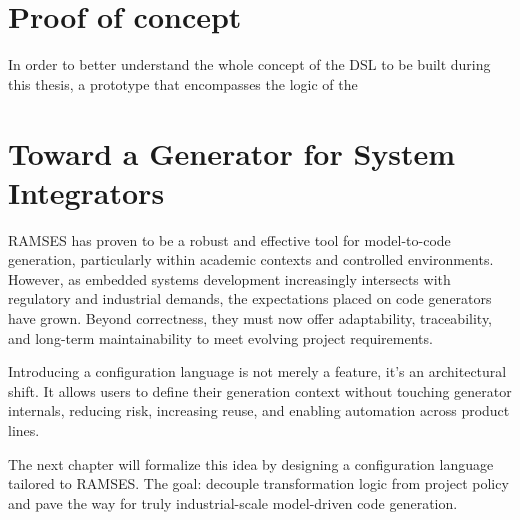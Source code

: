 \section{Proof of concept}
\label{sec:proof_of_concept}

In order to better understand the whole concept of the DSL to be built during this thesis, a prototype that encompasses the logic of the 


\section{Toward a Generator for System Integrators}
\label{sec:conclusion_configurable_generation}

RAMSES has proven to be a robust and effective tool for model-to-code generation, particularly within academic contexts and controlled environments. However, as embedded systems development increasingly intersects with regulatory and industrial demands, the expectations placed on code generators have grown. Beyond correctness, they must now offer adaptability, traceability, and long-term maintainability to meet evolving project requirements.

Introducing a configuration language is not merely a feature, it's an architectural shift. It allows users to define their generation context without touching generator internals, reducing risk, increasing reuse, and enabling automation across product lines.

The next chapter will formalize this idea by designing a configuration language tailored to RAMSES. The goal: decouple transformation logic from project policy and pave the way for truly industrial-scale model-driven code generation.


